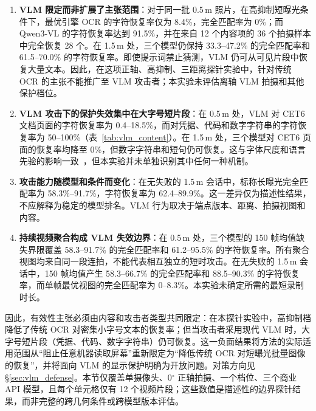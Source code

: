 \documentclass{ieeeaccess}
\begin{document}
\begin{enumerate}
\item \textbf{VLM 限定而非扩展了主张范围}：对于同一批 0.5\,m 照片，在高抑制短曝光条件下，最优引擎 OCR 的字符恢复率仅为 8.4\%，完全匹配率为 0\%；而 Qwen3-VL 的字符恢复率达到 91.5\%，并在来自 12 个内容项的 36 个拍摄样本中完全恢复 28 个。在 1.5\,m 处，三个模型仍保持 33.3--47.2\% 的完全匹配率和 61.5--70.0\% 的字符恢复率。即使提示词禁止猜测，VLM 仍可从可见片段中恢复大量文本。因此，在这项正轴、高抑制、三距离探针实验中，针对传统 OCR 的主张不能推广至 VLM 攻击者；本实验未评估离轴 VLM 拍摄和其他保护档位。

\item \textbf{VLM 攻击下的保护失效集中在大字号短片段}：在 0.5\,m 处，VLM 对 CET6 文档页面的字符恢复率为 0.4--18.5\%，而对凭据、代码和数字字符串的字符恢复率为 50--100\%（表~\ref{tab:vlm_content}）。在 1.5\,m 处，三个模型对 CET6 页面的恢复率均降至 0\%，但数字字符串和短句仍可恢复。这与字体尺度和语言先验的影响一致~\cite{b_shi2023,b_jiang2025}，但本实验并未单独识别其中任何一种机制。

\item \textbf{攻击能力随模型和条件而变化}：在无失败的 1.5\,m 会话中，标称长曝光完全匹配率为 58.3\%--91.7\%，字符恢复率为 62.4--89.9\%。这一差异仅为描述性结果，不应解释为稳定的模型排名。VLM 行为取决于端点版本、距离、拍摄视图和内容。

\item \textbf{持续视频聚合构成 VLM 失效边界}：在 0.5\,m 处，三个模型的 150 帧均值缺失界限覆盖 58.3--91.7\% 的完全匹配率和 61.2--95.5\% 的字符恢复率。所有聚合视图均来自同一段连拍，不能代表相互独立的短时攻击。在无失败的 1.5\,m 会话中，150 帧均值产生 58.3--66.7\% 的完全匹配率和 88.5--90.3\% 的字符恢复率，而单帧最优视图的完全匹配率为 0--8.3\%。本实验未确定所需的最短录制时长。
\end{enumerate}

因此，有效性主张必须由内容和攻击者类型共同限定：在本探针实验中，高抑制档降低了传统 OCR 对密集小字号文本的恢复率；但当攻击者采用现代 VLM 时，大字号短片段（凭据、代码、数字字符串）仍可恢复。这一负面结果将方法的实际适用范围从“阻止任意机器读取屏幕”重新限定为“降低传统 OCR 对短曝光批量图像的恢复”，并将面向 VLM 的显示保护明确为开放问题。对策方向见 \S\ref{sec:vlm_defense}。本节仅覆盖单摄像头、0$^{\circ}$ 正轴拍摄、一个档位、三个商业 API 模型，且每个单元格仅有 12 个视频片段；这些数值是描述性的边界探针结果，而非完整的跨几何条件或跨模型版本评估。
\end{document}
